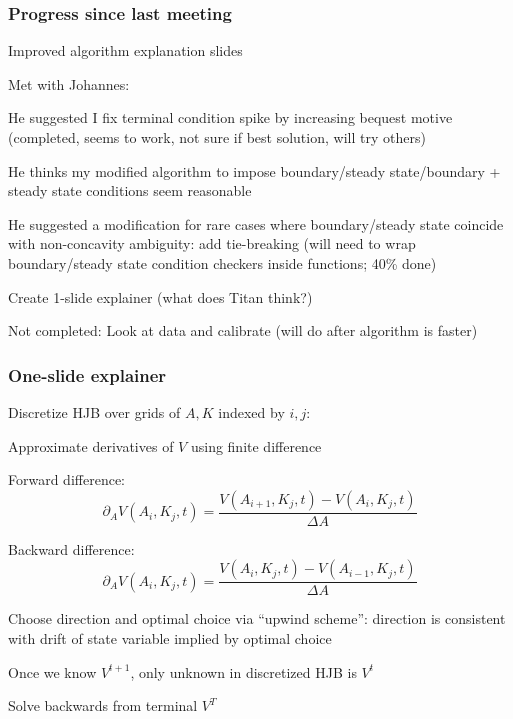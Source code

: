 \documentclass[aspectratio=169]{beamer}
\newenvironment{wideitemize}{\itemize\addtolength{\itemsep}{10pt}}{\enditemize}
\begin{document}
\begin{frame}
    \frametitle{Progress since last meeting}
    
    \begin{wideitemize}
        \item Improved algorithm explanation slides
        \item Met with Johannes:
        \begin{wideitemize}
            \item He suggested I fix terminal condition spike by increasing bequest motive (completed, seems to work, not sure if best solution, will try others)
            \item He thinks my modified algorithm to impose boundary/steady state/boundary + steady state conditions seem reasonable
            \item He suggested a modification for rare cases where boundary/steady state coincide with non-concavity ambiguity: add tie-breaking (will need to wrap boundary/steady state condition checkers inside functions; 40\% done)
            \item Create 1-slide explainer (what does Titan think?)
        \end{wideitemize}
        \item Not completed: Look at data and calibrate (will do after algorithm is faster)
    \end{wideitemize}

\end{frame}

\begin{frame}
    \frametitle{One-slide explainer}

    \begin{wideitemize}
        \item Discretize HJB over grids of $A, K$ indexed by $i, j$:
        \item Approximate derivatives of $V$ using finite difference
        \item Forward difference: 
        \begin{equation}
            \partial_A V(A_i, K_j, t) = \frac{V(A_{i+1}, K_j, t) - V(A_{i}, K_j, t)}{\Delta A}
        \end{equation}
        \item Backward difference: 
        \begin{equation}
            \partial_A V(A_i, K_j, t) = \frac{V(A_{i}, K_j, t) - V(A_{i-1}, K_j, t)}{\Delta A}
        \end{equation}
        \item Choose direction and optimal choice via ``upwind scheme'': direction is consistent with drift of state variable implied by optimal choice
        \item Once we know $V^{t+1}$, only unknown in discretized HJB is $V^t$
        \item Solve backwards from terminal $V^T$
    \end{wideitemize}

\end{frame}
\end{document}
